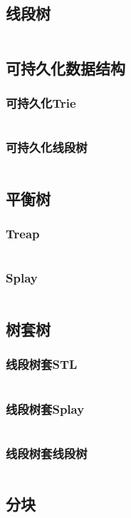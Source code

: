 \documentclass[a4paper,12pt]{article}
\begin{document}
\subsection{线段树}
\inputminted[breaklines, linenos]{c++}{ds/seg_tree.cc}
\subsection{可持久化数据结构}
\subsubsection{可持久化Trie}
\inputminted[breaklines, linenos]{c++}{ds/last_trie.cc}
\subsubsection{可持久化线段树}
\inputminted[breaklines, linenos]{c++}{ds/last_seg.cc}
\subsection{平衡树}
\subsubsection{Treap}
\inputminted[breaklines, linenos]{c++}{ds/treap.cc}
\subsubsection{Splay}
\inputminted[breaklines, linenos]{c++}{ds/splay.cc}
\subsection{树套树}
\subsubsection{线段树套STL}
\inputminted[breaklines, linenos]{c++}{ds/stl_in_seg.cc}
\subsubsection{线段树套Splay}
\inputminted[breaklines, linenos]{c++}{ds/splay_in_seg.cc}
\subsubsection{线段树套线段树}
\inputminted[breaklines, linenos]{c++}{ds/seg_in_seg.cc}
\subsection{分块}
\inputminted[breaklines, linenos]{c++}{ds/decompose.cc}
\end{document}
